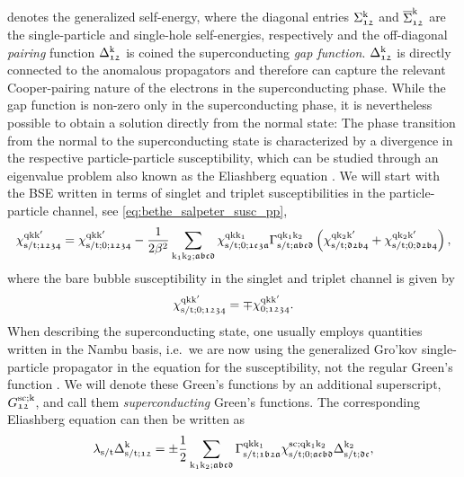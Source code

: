 \documentclass[../../main.tex]{subfiles}
\begin{document}
denotes the generalized self-energy, where the diagonal entries $\Sigma_{\mathfrak{12}}^{\text{k}}$ and $\overline{\Sigma}_{\mathfrak{12}}^{\text{k}}$ are the single-particle and single-hole self-energies, respectively and the off-diagonal \textit{pairing} function $\Delta_{\mathfrak{12}}^{\text{k}}$ is coined the superconducting \textit{gap function}. $\Delta_{\mathfrak{12}}^{\text{k}}$ is directly connected to the anomalous propagators and therefore can capture the relevant Cooper-pairing nature of the electrons in the superconducting phase. While the gap function is non-zero only in the superconducting phase, it is nevertheless possible to obtain a solution directly from the normal state: The phase transition from the normal to the superconducting state is characterized by a divergence in the respective particle-particle susceptibility, which can be studied through an eigenvalue problem also known as the Eliashberg equation \cite{Berges2016}. We will start with the BSE written in terms of singlet and triplet susceptibilities in the particle-particle channel, see \eqref{eq:bethe_salpeter_susc_pp},
\begin{align}
\chi^{\text{q}\text{k}\text{k}'}_{\text{s}/\text{t};\mathfrak{1234}}=\chi^{\text{q}\text{k}\text{k}'}_{\text{s}/\text{t};0;\mathfrak{1234}}-\frac{1}{2\beta^2}\sum_{\text{k}_1\text{k}_2;\mathfrak{abcd}}\chi^{\text{q}\text{k}\text{k}_1}_{\text{s}/\text{t};0;\mathfrak{1c3a}}\Gamma^{\text{q}\text{k}_1\text{k}_2}_{\text{s}/\text{t};\mathfrak{abcd}}\left (\chi^{\text{q}\text{k}_2\text{k}'}_{\text{s}/\text{t};\mathfrak{d2b4}}+\chi^{\text{q}\text{k}_2\text{k}'}_{\text{s}/\text{t};0;\mathfrak{d2b4}}\right ),
\end{align}
where the bare bubble susceptibility in the singlet and triplet channel is given by \cite{Gingras2019}
\begin{align}
	\chi^{\text{q}\text{k}\text{k}'}_{\text{s}/\text{t};0;\mathfrak{1234}}=\mp\chi^{\text{q}\text{k}\text{k}'}_{0;\mathfrak{1234}}.
\end{align}
When describing the superconducting state, one usually employs quantities written in the Nambu basis, i.e.\ we are now using the generalized Gro'kov single-particle propagator in the equation for the susceptibility, not the regular Green's function \cite{Nambu1950, Putzer2023}. We will denote these Green's functions by an additional superscript, $G^{\text{sc};\text{k}}_{\mathfrak{12}}$, and call them \textit{superconducting} Green's functions. The corresponding Eliashberg equation can then be written as
\begin{align}\label{eq:full_eliashberg}
	\lambda_{\text{s}/\text{t}}\Delta_{\text{s}/\text{t};\mathfrak{12}}^{\text{k}}=\pm\frac{1}{2}\sum_{\text{k}_1\text{k}_2;\mathfrak{abcd}}\Gamma^{\text{q}\text{k}\text{k}_1}_{\text{s}/\text{t};\mathfrak{1b2a}}\chi^{\text{sc};\text{q}\text{k}_1\text{k}_2}_{\text{s}/\text{t};0;\mathfrak{acbd}}\Delta_{\text{s}/\text{t};\mathfrak{dc}}^{\text{k}_2},
\end{align}
\end{document}
